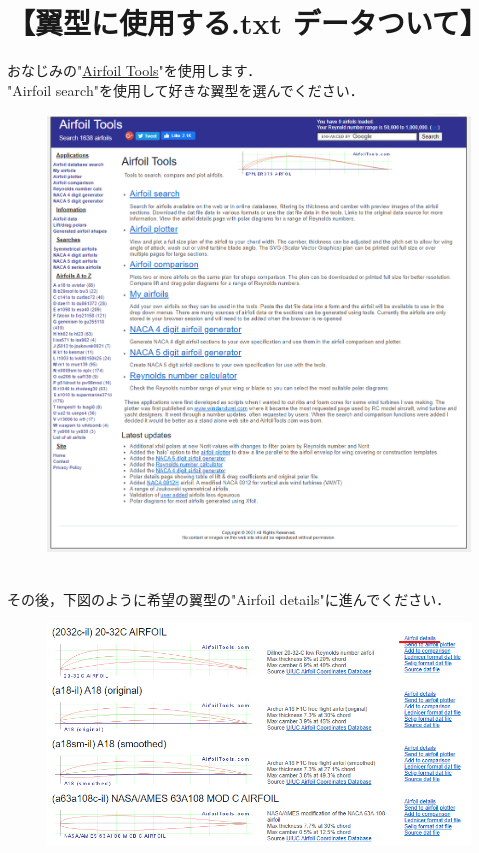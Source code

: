 \documentclass[12pt,a4paper]{jsarticle}
\begin{document}
\section*{【翼型に使用する.txt データついて】}
おなじみの"\href{{http://airfoiltools.com}}{Airfoil Tools}"を使用します．\\
"Airfoil search"を使用して好きな翼型を選んでください．
\begin{figure}[htbp]
    \begin{center}
        \includegraphics[width=120mm]{images/image_4.png}
    \end{center}
\end{figure} \\
その後，下図のように希望の翼型の"Airfoil details"に進んでください．
\begin{figure}[htbp]
    \begin{center}
        \includegraphics[width=120mm]{images/image_5.png}
    \end{center}
\end{figure} \\
\end{document}
